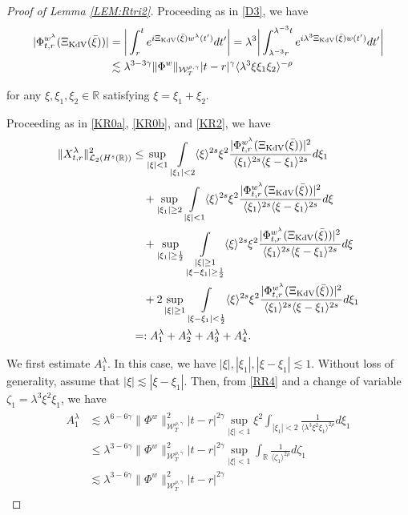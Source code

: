 \documentclass[letterpaper, 11pt,  reqno]{amsart}
\DeclareMathOperator*{\intt}{\int}
\newcommand{\1}{\hspace{0.5mm}\text{I}\hspace{0.5mm}}
\newcommand{\noi}{\noindent}
\newcommand{\R}{\mathbb{R}}
\newcommand{\g}{\gamma}
\newcommand{\ld}{\lambda}
\newcommand{\les}{\lesssim}
\newcommand{\jb}[1]
{\langle #1 \rangle}
\newcommand{\cL}{\mathcal{L}}
\newcommand{\W}{\mathcal{W}}
\newcommand{\z}{\zeta}
\newcommand{\KDV}{\text{\rm KdV} }
\numberwithin{equation}{section}
\numberwithin{theorem}{section}
\begin{document}
\begin{proof}[Proof of Lemma \ref{LEM:Rtri2}]
Proceeding as in 
 \eqref{D3}, 
we have
\begin{align}
\begin{aligned}
|\Phi^{w^\ld}_{t,r} (\Xi_\KDV(\bar \xi)) |
& = \bigg| 
\int_{r}^{t}  e^{i  \Xi_\KDV (\bar \xi) w^{\ld}(t') } d t'
\bigg|
= \ld^3   \bigg|  \int_{\ld^{-3}r}^{\ld^{-3}t} 
e^{i  \ld^3  \Xi_\KDV(\bar \xi)  w(t') } dt'  \bigg|  \\
& \les 
\ld^{3 -3\g} 
 \|\Phi^{w}  \|_{\W_{T}^{\rho, \g}}
 |t-r|^{\g} 
\jb{\ld^3 \xi \xi_1 \xi_2}^{-\rho}
\end{aligned}
\label{RR4}
\end{align} 




\noi
 for any $\xi, \xi_1, \xi_2\in \R$ satisfying $\xi = \xi_1+ \xi_2$.





Proceeding as in \eqref{KR0a}, 
\eqref{KR0b}, and \eqref{KR2}, we have
\begin{align}
\|X_{t , r }^\ld\|^2_{\cL _2 (H^s (\R))}
 &
\le
\sup_{|\xi|< 1} 
  \intt_{|\xi_1|< 2} 
  \jb{\xi}^{ 2s }\xi^2
   \frac{|\Phi^{w^\ld}_{t,r} (\Xi_\KDV(\bar \xi)) |^2}{ \jb{\xi_1}^{2s}  \jb{\xi - \xi_1}^{2s}}  d\xi_1
\notag \\
& \quad + 
\sup_{|\xi_1|\ge 2}
\intt_{|\xi|< 1} \jb{\xi}^{2s}
\xi^2
\frac{|\Phi^{w^\ld}_{t,r} (\Xi_\KDV(\bar \xi)) |^2}{\jb{\xi_1}^{2s}\jb{\xi - \xi_1}^{2s}} d\xi
\notag \\ 
& \quad +
\sup_{|\xi_1|\ge \frac 12}
\intt_{\substack{|\xi|\ge 1\\|\xi-\xi_1|\ge \frac 12 }} 
\jb{\xi}^{2s}\xi^2
\frac{|\Phi^{w^\ld}_{t,r} (\Xi_\KDV(\bar \xi)) |^2}{\jb{\xi_1}^{2s}\jb{\xi - \xi_1}^{2s}} d\xi
\label{RR5} \\
& \quad +
2\sup_{|\xi|\ge 1} 
  \intt_{|\xi - \xi_1|< \frac 12} 
  \jb{\xi}^{ 2s }\xi^2
   \frac{|\Phi^{w^\ld}_{t,r} (\Xi_\KDV(\bar \xi)) |^2}{ \jb{\xi_1}^{2s}  \jb{\xi - \xi_1}^{2s}}  d\xi_1
\notag \\
& =:
A^\ld_1+ A^\ld_2 + A^\ld_3 + A^\ld_4.
\notag
\end{align}



We first estimate $A^\ld_1$.
In this case, we have $|\xi|, |\xi_1|, |\xi - \xi_1|\les 1$.
Without loss of generality, 
assume that  $|\xi| \les |\xi - \xi_1|$.
Then, from  \eqref{RR4}
and a change of variable $\z_1 = \ld^3 \xi^2 \xi_1$, we have
\begin{align}
\begin{split}
A^\ld_1 
& \les \ld^{6 -6\g} 
 \|\Phi^{w}  \|_{\W_{T}^{\rho, \g}}^2
 |t-r|^{2\g} 
\sup_{|\xi|< 1} 
\xi^2  \intt_{|\xi_1|< 2} 
\frac{1}{\jb{\ld^3 \xi^2 \xi_1 }^{2\rho}}
 d\xi_1\\
& \le \ld^{3 -6\g} 
 \|\Phi^{w}  \|_{\W_{T}^{\rho, \g}}^2
 |t-r|^{2\g} 
\sup_{|\xi|< 1} 
 \intt_\R
\frac{1}{\jb{\z_1 }^{2\rho}}
 d\z_1\\
& \les \ld^{3 -6\g} 
 \|\Phi^{w}  \|_{\W_{T}^{\rho, \g}}^2
 |t-r|^{2\g} 
 \end{split}
\label{RR6}
\end{align}


\end{proof}
\end{document}
